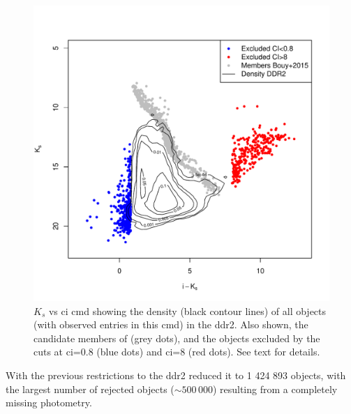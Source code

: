 \begin{figure}[ht!]
\begin{center}
\includegraphics[width=\textwidth]{background/Figures/ColourCuts.pdf}
\caption{$K_s$ vs \gls{ci} \gls{cmd} showing the density (black contour lines) of all objects (with observed entries in this \gls{cmd}) in the \gls{ddr2}. Also shown, the candidate members of \citet{Bouy2015} (grey dots), and the objects excluded by the cuts at \gls{ci}=0.8 (blue dots) and \gls{ci}=8 (red dots). See text for details.}
\label{fig:incompatible_objects}
\end{center}
\end{figure}


With the previous restrictions to the \gls{ddr2} reduced it to 1 424 893 objects, with the largest number of rejected objects ($\sim 500\, 000$) resulting from a completely missing photometry.


